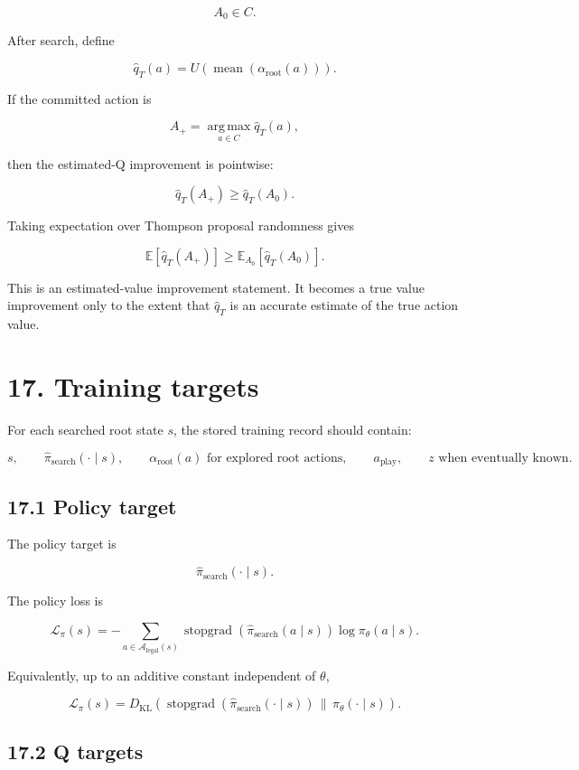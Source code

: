 \documentclass[11pt]{article}
\newcommand{\E}{\mathbb{E}}
\newcommand{\argmax}{\operatorname*{arg\,max}}
\newcommand{\mean}{\operatorname{mean}}
\newcommand{\stopgrad}{\operatorname{stopgrad}}
\newcommand{\Legal}{\mathcal{A}_{\mathrm{legal}}}
\newcommand{\Utility}{U}
\begin{document}
\[
A_0 \in C.
\]

After search, define

\[
\hat{q}_T(a)
=
\Utility
\left(
\mean
\left(
\alpha_{\mathrm{root}}(a)
\right)
\right).
\]

If the committed action is

\[
A_+
=
\argmax_{a\in C}
\hat{q}_T(a),
\]

then the estimated-Q improvement is pointwise:

\[
\hat{q}_T(A_+)
\ge
\hat{q}_T(A_0).
\]

Taking expectation over Thompson proposal randomness gives

\[
\E
\left[
\hat{q}_T(A_+)
\right]
\ge
\E_{A_0}
\left[
\hat{q}_T(A_0)
\right].
\]

This is an estimated-value improvement statement. It becomes a true value
improvement only to the extent that \(\hat{q}_T\) is an accurate estimate of the
true action value.

\section*{17. Training targets}

For each searched root state \(s\), the stored training record should contain:

\[
s,
\qquad
\hat{\pi}_{\mathrm{search}}(\cdot\mid s),
\qquad
\alpha_{\mathrm{root}}(a)
\text{ for explored root actions},
\qquad
a_{\mathrm{play}},
\qquad
z \text{ when eventually known}.
\]

\subsection*{17.1 Policy target}

The policy target is

\[
\hat{\pi}_{\mathrm{search}}(\cdot\mid s).
\]

The policy loss is

\[
\mathcal{L}_\pi(s)
=
-
\sum_{a\in\Legal(s)}
\stopgrad
\left(
\hat{\pi}_{\mathrm{search}}(a\mid s)
\right)
\log
\pi_\theta(a\mid s).
\]

Equivalently, up to an additive constant independent of \(\theta\),

\[
\mathcal{L}_\pi(s)
=
D_{\mathrm{KL}}
\left(
\stopgrad
\left(
\hat{\pi}_{\mathrm{search}}(\cdot\mid s)
\right)
\,\|\,
\pi_\theta(\cdot\mid s)
\right).
\]

\subsection*{17.2 Q targets}
\end{document}
